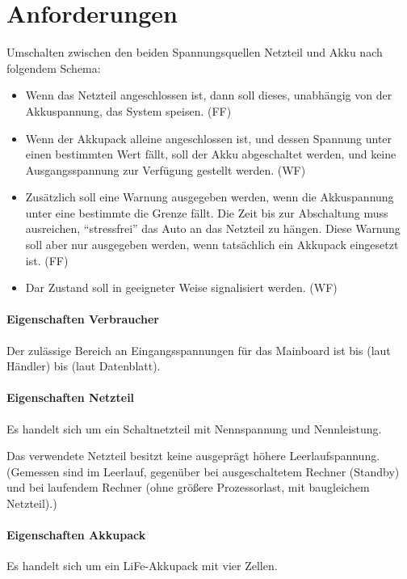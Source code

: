 
\section{Anforderungen}


Umschalten zwischen den beiden Spannungsquellen Netzteil und Akku nach folgendem Schema:
\begin{itemize}
	\item Wenn das Netzteil angeschlossen ist, dann soll dieses, unabhängig von der Akkuspannung, das System speisen. (FF)
	\item Wenn der Akkupack alleine angeschlossen ist, und dessen Spannung unter einen bestimmten Wert fällt, soll der Akku abgeschaltet werden, und keine Ausgangsspannung zur Verfügung gestellt werden. (WF)
	\item Zusätzlich soll eine Warnung ausgegeben werden, wenn die Akkuspannung unter eine bestimmte die Grenze fällt. Die Zeit bis zur Abschaltung muss ausreichen, "`stressfrei"' das Auto an das Netzteil zu hängen. Diese Warnung soll aber nur ausgegeben werden, wenn tatsächlich ein Akkupack eingesetzt ist. (FF)
	\item Dar Zustand soll in geeigneter Weise signalisiert werden. (WF)
\end{itemize}


\paragraph{Eigenschaften Verbraucher}
Der zulässige Bereich an Eingangsspannungen für das Mainboard ist  bis  (laut Händler) \bzw {} bis  (laut Datenblatt).


\paragraph{Eigenschaften Netzteil}
Es handelt sich um ein Schaltnetzteil mit  Nennspannung und  Nennleistung.

Das verwendete Netzteil besitzt keine ausgeprägt höhere Leerlaufspannung. (Gemessen sind  im Leerlauf, gegenüber  bei ausgeschaltetem Rechner (Standby) und  bei laufendem Rechner (ohne größere Prozessorlast,  mit baugleichem Netzteil).)


\paragraph{Eigenschaften Akkupack}
Es handelt sich um ein LiFe-Akkupack mit vier Zellen.

